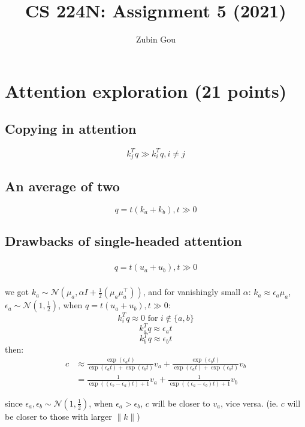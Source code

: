 \documentclass{homework}
\title{CS 224N: Assignment 5 (2021)}
\author{Zubin Gou}
\begin{document}
\maketitle

\section{Attention exploration (21 points)}
\subsection{Copying in attention}
$$k_j^Tq \gg k_i^Tq, i\neq j $$

\subsection{An average of two}
$$q = t(k_a+k_b), t\gg 0$$

\subsection{Drawbacks of single-headed attention}
\subsubsection{}
$$q = t(u_a+u_b), t\gg 0$$

\subsubsection{}

we got $k_{a} \sim \mathcal{N}\left(\mu_{a}, \alpha I+\frac{1}{2}\left(\mu_{a} \mu_{a}^{\top}\right)\right)$, and for vanishingly small $\alpha$: $k_{a} \approx \epsilon_{a} \mu_{a}$, $\epsilon_a \sim \mathcal{N}(1, \frac{1}{2})$, when $q = t(u_a+u_b), t\gg 0$:
$$k_i^Tq \approx 0 \text{ for } i \notin\{a, b\}$$
$$k_a^Tq \approx \epsilon_a t$$
$$k_b^Tq \approx \epsilon_b t$$
then:
$$
\begin{aligned}
c & \approx \frac{\exp (\epsilon_a t)}{\exp (\epsilon_a t)+\exp (\epsilon_b t)} v_{a}+\frac{\exp (\epsilon_b t)}{\exp (\epsilon_a t)+\exp (\epsilon_b t)} v_{b} \\
&=\frac{1}{\exp ((\epsilon_b-\epsilon_a) t)+1} v_{a}+\frac{1}{\exp ((\epsilon_a-\epsilon_b) t)+1} v_{b}
\end{aligned}
$$

since $\epsilon_a, \epsilon_b \sim \mathcal{N}(1, \frac{1}{2})$, when $\epsilon_a > \epsilon_b$, $c$ will be closer to $v_a$, vice versa. (ie. $c$ will be closer to those with larger $\| k\|$)
\end{document}
